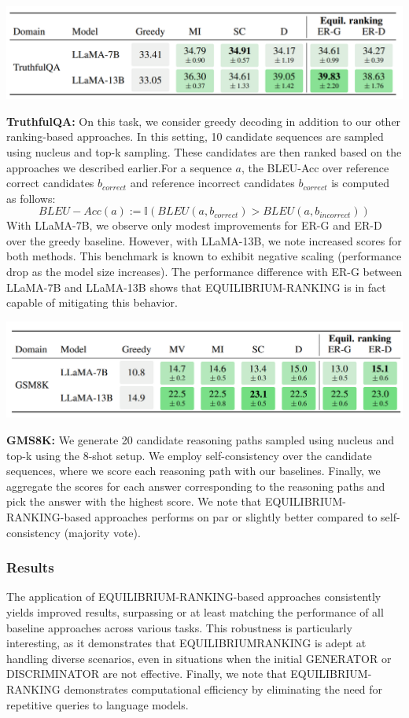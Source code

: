 \documentclass[12pt]{article}
\begin{document}
\begin{center}
  \includegraphics*[scale = 0.7]{table16.png}
\end{center}
\textbf{TruthfulQA:} On this task, we consider greedy decoding in addition to our other
ranking-based approaches. In this setting, 10 candidate sequences are sampled using nucleus and
top-k sampling. These candidates are then ranked based on the approaches we described earlier.For a sequence $a$, the BLEU-Acc over reference correct candidates
$b_{correct}$ and reference incorrect candidates $b_{correct}$ is computed as follows:
\[BLEU-Acc(a):=\mathbb{I}(BLEU(a,b_{correct})>BLEU(a,b_{incorrect}))\]
With LLaMA-7B, we observe only modest improvements for ER-G
and ER-D over the greedy baseline. However, with LLaMA-13B, we note increased scores for
both methods. This benchmark is known to exhibit negative scaling (performance
drop as the model size increases). The performance difference with ER-G between LLaMA-7B and
LLaMA-13B shows that EQUILIBRIUM-RANKING is in fact capable of mitigating this behavior.
\begin{center}
  \includegraphics*[scale = 0.7]{table17.png}
\end{center}
\textbf{GMS8K:} We generate 20 candidate reasoning paths sampled using nucleus and top-k
using the 8-shot setup. We employ self-consistency over the candidate sequences, where we score each reasoning path with our baselines. Finally, we aggregate the scores for each answer corresponding to the reasoning paths and pick the answer with the highest score. We note that EQUILIBRIUM-RANKING-based
approaches performs on par or slightly better compared to self-consistency (majority vote).
\subsubsection{Results}
The application of EQUILIBRIUM-RANKING-based approaches consistently yields
improved results, surpassing or at least matching the performance of all baseline approaches across
various tasks. This robustness is particularly interesting, as it demonstrates that EQUILIBRIUMRANKING is adept at handling diverse scenarios, even in situations when the initial GENERATOR or
DISCRIMINATOR are not effective. Finally, we note that EQUILIBRIUM-RANKING demonstrates computational efficiency
by eliminating the need for repetitive queries to language models.
\end{document}
